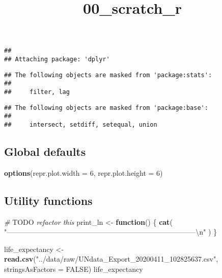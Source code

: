 \documentclass[]{article}
\title{00\_scratch\_r}
\author{}
\date{}
\newenvironment{Shaded}{\begin{snugshade}}{\end{snugshade}}
\newcommand{\AlertTok}[1]{\textcolor[rgb]{0.94,0.16,0.16}{#1}}
\newcommand{\CharTok}[1]{\textcolor[rgb]{0.31,0.60,0.02}{#1}}
\newcommand{\CommentTok}[1]{\textcolor[rgb]{0.56,0.35,0.01}{\textit{#1}}}
\newcommand{\ControlFlowTok}[1]{\textcolor[rgb]{0.13,0.29,0.53}{\textbf{#1}}}
\newcommand{\DataTypeTok}[1]{\textcolor[rgb]{0.13,0.29,0.53}{#1}}
\newcommand{\DecValTok}[1]{\textcolor[rgb]{0.00,0.00,0.81}{#1}}
\newcommand{\KeywordTok}[1]{\textcolor[rgb]{0.13,0.29,0.53}{\textbf{#1}}}
\newcommand{\NormalTok}[1]{#1}
\newcommand{\OtherTok}[1]{\textcolor[rgb]{0.56,0.35,0.01}{#1}}
\newcommand{\StringTok}[1]{\textcolor[rgb]{0.31,0.60,0.02}{#1}}
\begin{document}
\maketitle

\begin{verbatim}
## 
## Attaching package: 'dplyr'
\end{verbatim}

\begin{verbatim}
## The following objects are masked from 'package:stats':
## 
##     filter, lag
\end{verbatim}

\begin{verbatim}
## The following objects are masked from 'package:base':
## 
##     intersect, setdiff, setequal, union
\end{verbatim}

\hypertarget{global-defaults}{%
\subsection{Global defaults}\label{global-defaults}}

\begin{Shaded}
\begin{Highlighting}[]
\KeywordTok{options}\NormalTok{(}\DataTypeTok{repr.plot.width =} \DecValTok{6}\NormalTok{, }\DataTypeTok{repr.plot.height =} \DecValTok{6}\NormalTok{)}
\end{Highlighting}
\end{Shaded}

\hypertarget{utility-functions}{%
\subsection{Utility functions}\label{utility-functions}}

\begin{Shaded}
\begin{Highlighting}[]
\CommentTok{# }\AlertTok{TODO}\CommentTok{ refactor this }
\NormalTok{print_ln <-}\StringTok{ }\ControlFlowTok{function}\NormalTok{() \{}
  \KeywordTok{cat}\NormalTok{(  }\StringTok{"--------------------------------------------------------------------------------}\CharTok{\textbackslash{}n}\StringTok{"}\NormalTok{  )}
\NormalTok{\}}
\end{Highlighting}
\end{Shaded}

\begin{Shaded}
\begin{Highlighting}[]
\NormalTok{life_expectancy <-}\StringTok{ }\KeywordTok{read.csv}\NormalTok{(}\StringTok{"../data/raw/UNdata_Export_20200411_102825637.csv"}\NormalTok{, }\DataTypeTok{stringsAsFactors =} \OtherTok{FALSE}\NormalTok{)}
\NormalTok{life_expectancy}
\end{Highlighting}
\end{Shaded}
\end{document}

